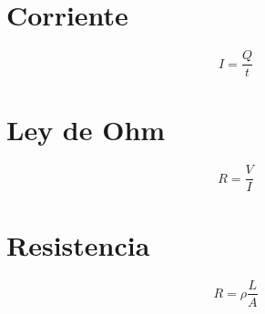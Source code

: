 \section{Corriente}

\begin{equation}
    I = \frac{Q}{t}    
\end{equation}

\section{Ley de Ohm}

\begin{equation}
    R = \frac{V}{I}
\end{equation}

\section{Resistencia}

\begin{equation}
    R = \rho \frac{L}{A}
\end{equation}